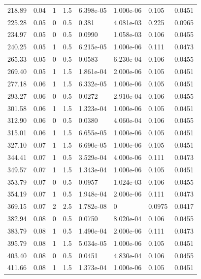\documentclass[preview]{standalone}
\begin{document}
{{\begin{tabular}{L{1.2cm}C{1.2cm} C{0.3cm}C{0.5cm} C{1.4cm}C{1.4cm} C{1.4cm}C{1.4cm}}
  218.89  &  0.04  & 1     & 1.5 &  6.398e-05  & 1.000e-06  & 0.105 &  0.0451   \\ 
  225.28  &  0.05  & 0     & 0.5 &  0.381  & 4.081e-03  & 0.225 &  0.0965   \\ 
  234.97  &  0.05  & 0     & 0.5 &  0.0990  & 1.058e-03  & 0.106 &  0.0455   \\ 
  240.25  &  0.05  & 1     & 0.5 &  6.215e-05  & 1.000e-06  & 0.111 &  0.0473   \\ 
  265.33  &  0.05  & 0     & 0.5 &  0.0583  & 6.230e-04  & 0.106 &  0.0455   \\ 
  269.40  &  0.05  & 1     & 1.5 &  1.861e-04  & 2.000e-06  & 0.105 &  0.0451   \\ 
  277.18  &  0.06  & 1     & 1.5 &  6.332e-05  & 1.000e-06  & 0.105 &  0.0451   \\ 
  293.27  &  0.06  & 0     & 0.5 &  0.0272  & 2.910e-04  & 0.106 &  0.0455   \\ 
  301.58  &  0.06  & 1     & 1.5 &  1.323e-04  & 1.000e-06  & 0.105 &  0.0451   \\ 
  312.90  &  0.06  & 0     & 0.5 &  0.0380  & 4.060e-04  & 0.106 &  0.0455   \\ 
  315.01  &  0.06  & 1     & 1.5 &  6.655e-05  & 1.000e-06  & 0.105 &  0.0451   \\ 
  327.10  &  0.07  & 1     & 1.5 &  6.690e-05  & 1.000e-06  & 0.105 &  0.0451   \\ 
  344.41  &  0.07  & 1     & 0.5 &  3.529e-04  & 4.000e-06  & 0.111 &  0.0473   \\ 
  349.57  &  0.07  & 1     & 1.5 &  1.343e-04  & 1.000e-06  & 0.105 &  0.0451   \\ 
  353.79  &  0.07  & 0     & 0.5 &  0.0957  & 1.024e-03  & 0.106 &  0.0455   \\ 
  354.19  &  0.07  & 1     & 0.5 &  1.948e-04  & 2.000e-06  & 0.111 &  0.0473   \\ 
  369.15  &  0.07  & 2     & 2.5 &  1.782e-08  & 0  & 0.0975 &  0.0417   \\ 
  382.94  &  0.08  & 0     & 0.5 &  0.0750  & 8.020e-04  & 0.106 &  0.0455   \\ 
  383.79  &  0.08  & 1     & 0.5 &  1.490e-04  & 2.000e-06  & 0.111 &  0.0473   \\ 
  395.79  &  0.08  & 1     & 1.5 &  5.034e-05  & 1.000e-06  & 0.105 &  0.0451   \\ 
  403.40  &  0.08  & 0     & 0.5 &  0.0451  & 4.830e-04  & 0.106 &  0.0455   \\ 
  411.66  &  0.08  & 1     & 1.5 &  1.373e-04  & 1.000e-06  & 0.105 &  0.0451   \\ 

\end{tabular}}}
\end{document}

